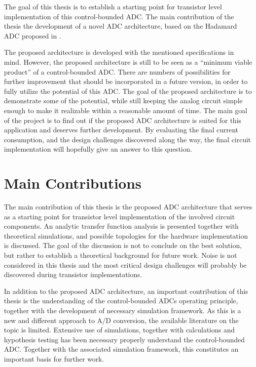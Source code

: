 

The goal of this thesis is to establish a starting point for transistor level implementation of this control-bounded ADC. The main contribution of the thesis the development of a novel ADC architecture, based on the Hadamard ADC proposed in \cite{malmberg_thesis}.

The proposed architecture is developed with the mentioned specifications in mind. However, the proposed architecture is still to be seen as a \enquote{minimum viable product} of a control-bounded ADC. There are numbers of possibilities for further improvement that should be incorporated in a future version, in order to fully utilize the potential of this ADC. The goal of the proposed architecture is to demonstrate some of the potential, while still keeping the analog circuit simple enough to make it realizable within a reasonable amount of time. The main goal of the project is to find out if the proposed ADC architecture is suited for this application and deserves further development. By evaluating the final current consumption, and the design challenges discovered along the way, the final circuit implementation will hopefully give an answer to this question.

\section{Main Contributions}
The main contribution of this thesis is the proposed ADC architecture that serves as a starting point for transistor level implementation of the involved circuit components. An analytic transfer function analysis is presented together with theoretical simulations, and possible topologies for the hardware implementation is discussed. The goal of the discussion is not to conclude on the best solution, but rather to establish a theoretical background for future work. Noise is not considered in this thesis and the most critical design challenges will probably be discovered during transistor implementations.

In addition to the proposed ADC architecture, an important contribution of this thesis is the understanding of the control-bounded ADCs operating principle, together with the development of necessary simulation framework. As this is a new and different approach to A/D conversion, the available literature on the topic is limited. Extensive use of simulations, together with calculations and hypothesis testing has been necessary properly understand the control-bounded ADC. Together with the associated simulation framework, this constitutes an important basis for further work.

